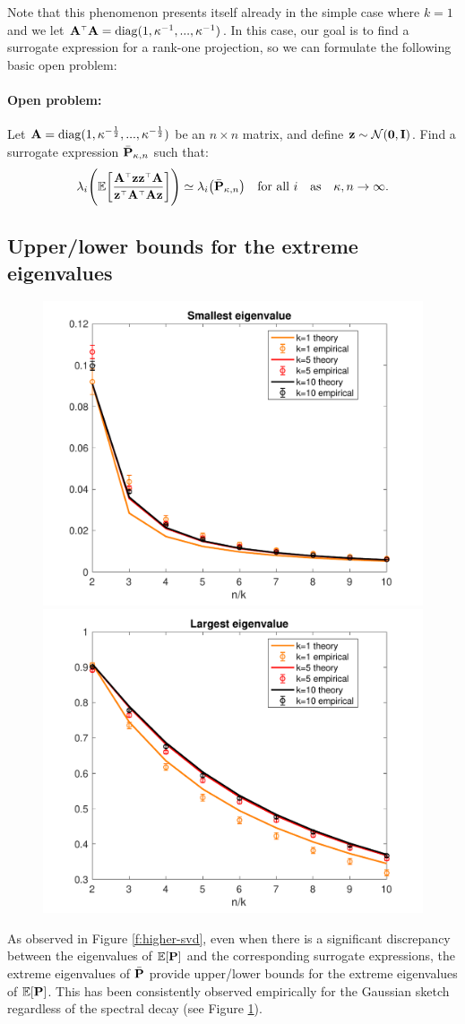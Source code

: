 \documentclass[11pt]{article}
\begin{document}
Note that this phenomenon presents itself already in the simple case
where $k=1$ and we let
$\A^\top\A=\diag(1,\kappa^{-1},...,\kappa^{-1})$. In this case, our
goal is to find a surrogate expression for a rank-one projection, so
we can formulate the following basic open problem:

\paragraph{Open problem:} Let
$\A=\diag(1,\kappa^{-\frac12},...,\kappa^{-\frac12})$ be an $n\times
n$ matrix, and define $\z\sim\Nc(\zero,\I)$. Find a surrogate
expression $\bar\P_{\kappa,n}$ such that:
\begin{align*}
  \lambda_i\Bigg(\E\bigg[\frac{\A^\top\z\z^\top\A}{\z^\top\A^\top\A\z}\bigg]\Bigg)
  \simeq \lambda_i\big(\bar\P_{\kappa,n}\big)\quad\text{for all $i$}\quad\text{as}\quad \kappa,n\rightarrow\infty.
\end{align*}

\subsection{Upper/lower bounds for the extreme eigenvalues}
\begin{figure}[h]
  \centering
\includegraphics[width=.4\textwidth]{lambda_min}\nobreak\includegraphics[width=.4\textwidth]{lambda_max}
\caption{}
\label{f:extreme}
\end{figure}


As observed in Figure \ref{f:higher-svd}, even when there is a
significant discrepancy between the eigenvalues of $\E[\P]$ and the
corresponding surrogate expressions, the extreme eigenvalues of
$\bar\P$ provide upper/lower bounds for the extreme eigenvalues of
$\E[\P]$. This has been consistently observed empirically for the Gaussian sketch
regardless of the spectral decay (see Figure \ref{f:extreme}).
\end{document}
